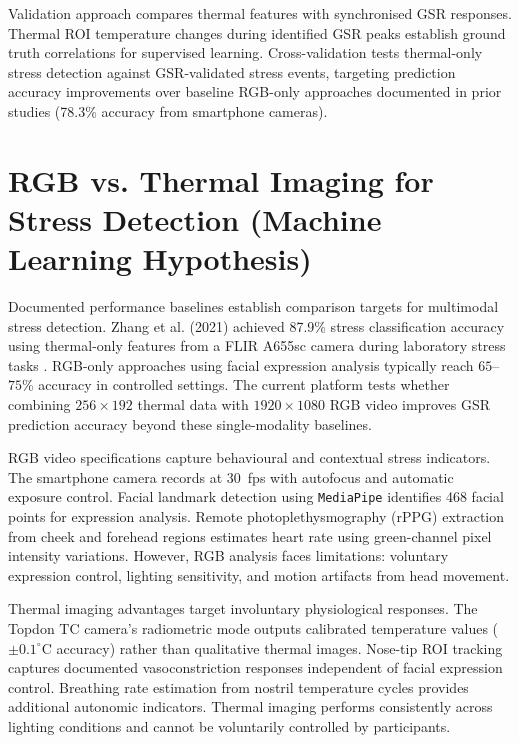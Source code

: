 \documentclass{report}
\begin{document}
    Validation approach compares thermal features with synchronised GSR responses. Thermal ROI temperature changes during identified GSR peaks establish ground truth correlations for supervised learning. Cross-validation tests thermal-only stress detection against GSR-validated stress events, targeting prediction accuracy improvements over baseline RGB-only approaches documented in prior studies (78.3\% accuracy from smartphone cameras).

    \section{RGB vs. Thermal Imaging for Stress Detection (Machine Learning Hypothesis)}
    \label{sec:rgb_vs_thermal}

    Documented performance baselines establish comparison targets for multimodal stress detection. Zhang et al. (2021) achieved 87.9\% stress classification accuracy using thermal-only features from a FLIR A655sc camera during laboratory stress tasks \cite{zhang2021}. RGB-only approaches using facial expression analysis typically reach $65$--$75$\% accuracy in controlled settings. The current platform tests whether combining $256 \times 192$ thermal data with $1920 \times 1080$ RGB video improves GSR prediction accuracy beyond these single-modality baselines.

    RGB video specifications capture behavioural and contextual stress indicators. The smartphone camera records at 30~fps with autofocus and automatic exposure control. Facial landmark detection using \texttt{MediaPipe} identifies 468 facial points for expression analysis. Remote photoplethysmography (rPPG) extraction from cheek and forehead regions estimates heart rate using green-channel pixel intensity variations. However, RGB analysis faces limitations: voluntary expression control, lighting sensitivity, and motion artifacts from head movement.

    Thermal imaging advantages target involuntary physiological responses. The Topdon TC camera's radiometric mode outputs calibrated temperature values ($\pm 0.1^{\circ}$C accuracy) rather than qualitative thermal images. Nose-tip ROI tracking captures documented vasoconstriction responses independent of facial expression control. Breathing rate estimation from nostril temperature cycles provides additional autonomic indicators. Thermal imaging performs consistently across lighting conditions and cannot be voluntarily controlled by participants.
\end{document}
